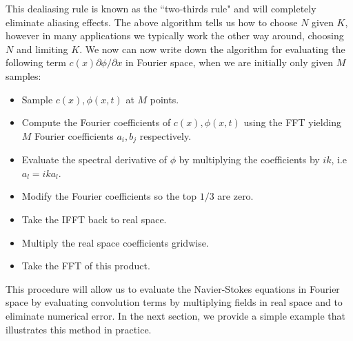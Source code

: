 This dealiasing rule is known as the ``two-thirds rule" and will completely eliminate aliasing effects. The above algorithm tells us how to choose $N$ given $K$, however in many applications we typically work the other way around, choosing $N$ and limiting $K$. We now can now write down the algorithm for evaluating the following term $c(x)\partial\phi/\partial x$ in Fourier space, when we are initially only given $M$ samples: 
\begin{itemize}
\item Sample $c(x),\phi(x,t)$ at $M$ points.
\item Compute the Fourier coefficients of $c(x),\phi(x,t)$ using the FFT yielding $M$ Fourier coefficients $a_{i},b_{j}$ respectively.
\item Evaluate the spectral derivative of $\phi$ by multiplying the coefficients by $ik$, i.e $a_{l}=ika_{l}$.
\item Modify the Fourier coefficients so the top $1/3$ are zero. 
\item Take the IFFT back to real space.
\item Multiply the real space coefficients gridwise.
\item Take the FFT of this product.
\end{itemize}
This procedure will allow us to evaluate the Navier-Stokes equations in Fourier space by evaluating convolution terms by multiplying fields in real space and to eliminate numerical error. In the next section, we provide a simple example that illustrates this method in practice.

